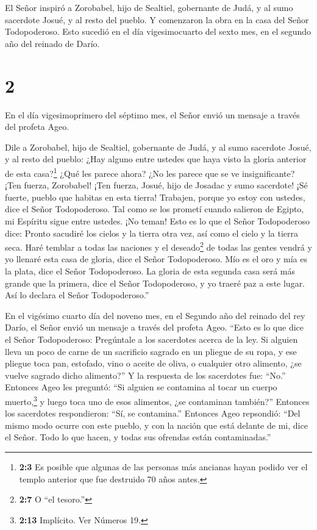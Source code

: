  El Señor inspiró a Zorobabel, hijo de Sealtiel, gobernante
de Judá, y al sumo sacerdote Josué, y al resto del pueblo. Y comenzaron
la obra en la casa del Señor Todopoderoso.  Esto sucedió en
el día vigesimocuarto del sexto mes, en el segundo año del reinado de
Darío.

\hypertarget{section-1}{%
\section{2}\label{section-1}}

 En el día vigesimoprimero del séptimo mes, el Señor envió
un mensaje a través del profeta Ageo.

 Dile a Zorobabel, hijo de Sealtiel, gobernante de Judá, y
al sumo sacerdote Josué, y al resto del pueblo:  ¿Hay alguno
entre ustedes que haya visto la gloria anterior de esta casa?\footnote{\textbf{2:3}
  Es posible que algunas de las personas más ancianas hayan podido ver
  el templo anterior que fue destruido 70 años antes.} ¿Qué les parece
ahora? ¿No les parece que se ve insignificante?  ¡Ten
fuerza, Zorobabel! ¡Ten fuerza, Josué, hijo de Josadac y sumo sacerdote!
¡Sé fuerte, pueblo que habitas en esta tierra! Trabajen, porque yo estoy
con ustedes, dice el Señor Todopoderoso.  Tal como se los
prometí cuando salieron de Egipto, mi Espíritu sigue entre ustedes. ¡No
teman!  Esto es lo que el Señor Todopoderoso dice: Pronto
sacudiré los cielos y la tierra otra vez, así como el cielo y la tierra
seca.  Haré temblar a todas las naciones y el
deseado\footnote{\textbf{2:7} O ``el tesoro.''} de todas las gentes
vendrá y yo llenaré esta casa de gloria, dice el Señor Todopoderoso.
 Mío es el oro y mía es la plata, dice el Señor
Todopoderoso.  La gloria de esta segunda casa será más
grande que la primera, dice el Señor Todopoderoso, y yo traeré paz a
este lugar. Así lo declara el Señor Todopoderoso.''

 En el vigésimo cuarto día del noveno mes, en el Segundo
año del reinado del rey Darío, el Señor envió un mensaje a través del
profeta Ageo.  ``Esto es lo que dice el Señor Todopoderoso:
Pregúntale a los sacerdotes acerca de la ley.  Si alguien
lleva un poco de carne de un sacrificio sagrado en un pliegue de su
ropa, y ese pliegue toca pan, estofado, vino o aceite de oliva, o
cualquier otro alimento, ¿se vuelve sagrado dicho alimento?'' Y la
respuesta de los sacerdotes fue: ``No.''  Entonces Ageo les
preguntó: ``Si alguien se contamina al tocar un cuerpo
muerto,\footnote{\textbf{2:13} Implícito. Ver Números 19.} y luego toca
uno de esos alimentos, ¿se contaminan también?'' Entonces los sacerdotes
respondieron: ``Sí, se contamina.''  Entonces Ageo
repsondió: ``Del mismo modo ocurre con este pueblo, y con la nación que
está delante de mi, dice el Señor. Todo lo que hacen, y todas sus
ofrendas están contaminadas.''

